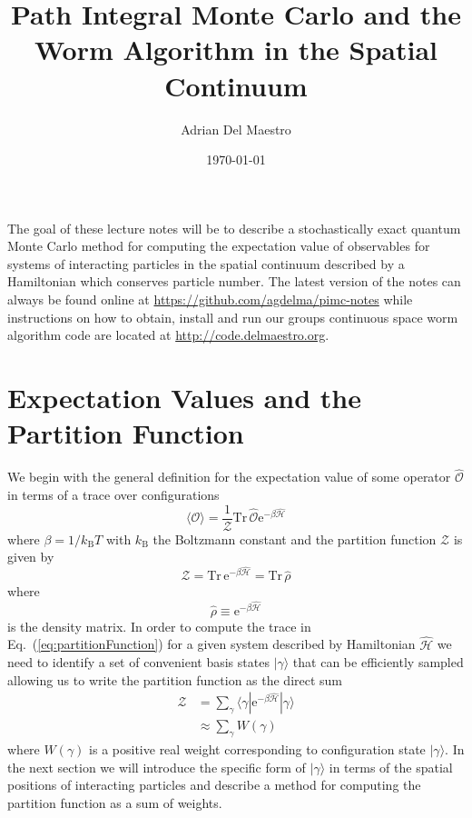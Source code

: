 \documentclass[prb,10pt,aps,floatfix,notitlepage]{revtex4-1}
\newcommand{\e}[1]{\mathrm{e}^{#1}}
\renewcommand{\eqref}[1]{Eq.~(\ref{#1})}
\begin{document}
\title{Path Integral Monte Carlo and the Worm Algorithm in the Spatial
Continuum}
\author{Adrian Del Maestro}

\date{\today}
\maketitle

The goal of these lecture notes will be to describe a stochastically exact
quantum Monte Carlo method for computing the expectation value of observables
for systems of interacting particles in the spatial continuum described by a
Hamiltonian  which conserves particle number.  The latest
version of the notes can always be found online at
\url{https://github.com/agdelma/pimc-notes} while instructions on how to
obtain, install and run our groups continuous space worm algorithm code are located at
\url{http://code.delmaestro.org}.

\section{Expectation Values and the Partition Function}

We begin with the general definition for the expectation value of some operator
$\hat{\mathcal{O}}$ in terms of a trace over configurations
%
\begin{equation}
    \langle \mathcal{O} \rangle = \frac{1}{\mathcal{Z}} \mathrm{Tr}\, 
    \hat{\mathcal{O}}\e{-\beta \hat{\mathcal{H}}} 
\label{eq:operatorExpectationValue}
\end{equation}
%
where $\beta = 1/k_{\mathrm{B}}T$ with $k_{\mathrm{B}}$ the Boltzmann constant
and the partition function $\mathcal{Z}$ is given by
%
\begin{equation}
    \mathcal{Z} = \mathrm{Tr}\,\e{-\beta \hat{\mathcal{H}}} 
    = \mathrm{Tr}\,\hat{\rho} 
\label{eq:partitionFunction} 
\end{equation}
%
where 
%
\begin{equation}
\hat{\rho} \equiv \e{-\beta \hat{\mathcal{H}}} 
\end{equation}
%
is the density matrix.  In order to compute the trace in
\eqref{eq:partitionFunction} for a given system described by Hamiltonian
$\hat{\mathcal{H}}$ we need to identify a set of convenient basis states
$|\gamma\rangle$ that can be efficiently sampled allowing us to write the
partition function as the direct sum 
%
\begin{align}
    \mathcal{Z} &=  \sum_{\gamma}\langle \gamma | \e{-\beta \hat{\mathcal{H}}}
    |\gamma \rangle \nonumber \\
    &\approx \sum_{\gamma} W(\gamma)
\end{align}
%
where $W(\gamma)$ is a positive real weight corresponding to configuration
state $|\gamma\rangle$.  In the next section we will introduce the specific
form of $|\gamma\rangle$ in terms of the spatial positions of interacting
particles and describe a method for computing the partition function as a sum
of weights.
\end{document}
